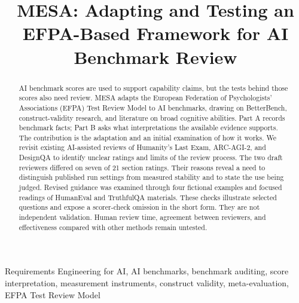 \documentclass[conference]{IEEEtran}
\begin{document}
\title{MESA: Adapting and Testing an EFPA-Based Framework for AI Benchmark Review}

\author{
\and
{}
}

\maketitle
\thispagestyle{plain}
\pagestyle{plain}

\begin{abstract}
AI benchmark scores are used to support capability claims, but the tests behind those scores also need review. MESA adapts the European Federation of Psychologists' Associations (EFPA) Test Review Model to AI benchmarks, drawing on BetterBench, construct-validity research, and literature on broad cognitive abilities. Part A records benchmark facts; Part B asks what interpretations the available evidence supports. The contribution is the adaptation and an initial examination of how it works. We revisit existing AI-assisted reviews of Humanity's Last Exam, ARC-AGI-2, and DesignQA to identify unclear ratings and limits of the review process. The two draft reviewers differed on seven of 21 section ratings. Their reasons reveal a need to distinguish published run settings from measured stability and to state the use being judged. Revised guidance was examined through four fictional examples and focused readings of HumanEval and TruthfulQA materials. These checks illustrate selected questions and expose a scorer-check omission in the short form. They are not independent validation. Human review time, agreement between reviewers, and effectiveness compared with other methods remain untested.
\end{abstract}

\begin{IEEEkeywords}
Requirements Engineering for AI, AI benchmarks, benchmark auditing, score interpretation, measurement instruments, construct validity, meta-evaluation, EFPA Test Review Model
\end{IEEEkeywords}
\end{document}
